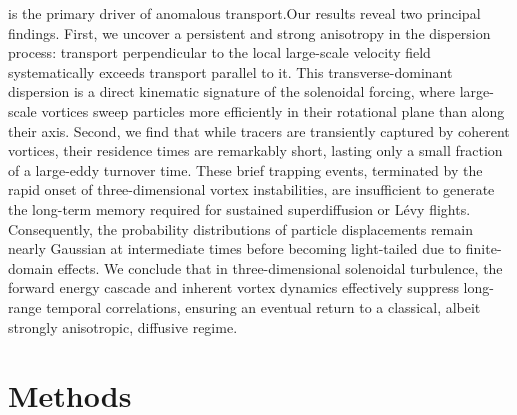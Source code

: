 \documentclass[]{article}
\begin{document}
is the primary driver of anomalous transport.Our results reveal two principal findings. First, we uncover a persistent and strong anisotropy in the dispersion process: transport perpendicular to the local large-scale velocity field systematically exceeds transport parallel to it. This transverse-dominant dispersion is a direct kinematic signature of the solenoidal forcing, where large-scale vortices sweep particles more efficiently in their rotational plane than along their axis. Second, we find that while tracers are transiently captured by coherent vortices, their residence times are remarkably short, lasting only a small fraction of a large-eddy turnover time. These brief trapping events, terminated by the rapid onset of three-dimensional vortex instabilities, are insufficient to generate the long-term memory required for sustained superdiffusion or Lévy flights. Consequently, the probability distributions of particle displacements remain nearly Gaussian at intermediate times before becoming light-tailed due to finite-domain effects. We conclude that in three-dimensional solenoidal turbulence, the forward energy cascade and inherent vortex dynamics effectively suppress long-range temporal correlations, ensuring an eventual return to a classical, albeit strongly anisotropic, diffusive regime.

\section{Methods}
\label{sec:methods}
\end{document}
